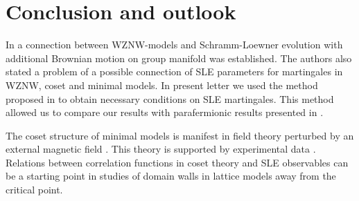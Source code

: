 \documentclass{jetpl}
\newcommand{\gf}{\mathfrak{g}}
\newcommand{\af}{\mathfrak{a}}
\begin{document}
\section{Conclusion and outlook}
\label{sec:outlook}

In  \cite{bettelheim2005stochastic} a connection between WZNW-models and Schramm-Loewner evolution with additional Brownian motion on group manifold was established. The authors also stated a problem of a possible connection of SLE parameters for martingales in WZNW, coset and minimal models. In present letter we used the method proposed in \cite{alekseev2010sle} to obtain necessary conditions on SLE martingales. This method allowed us to compare our results with parafermionic results presented in \cite{santachiara2008sle,picco2008numerical}.

The coset structure of minimal models is manifest in field theory perturbed by an external magnetic field \cite{fateev1990conformal,eguchi1989deformations,hollowood1989rational}. This theory is supported by experimental data \cite{coldea2010quantum}. Relations between correlation functions in coset theory and SLE observables can be a starting point in studies of domain walls in lattice models away from the  critical point.
\end{document}
